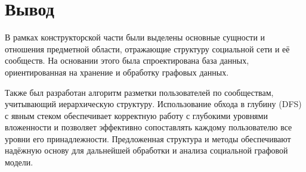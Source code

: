 \section*{Вывод}

В рамках конструкторской части были выделены основные сущности и отношения предметной области, отражающие структуру социальной сети и её сообществ. На основании этого была спроектирована база данных, ориентированная на хранение и обработку графовых данных.

Также был разработан алгоритм разметки пользователей по сообществам, учитывающий иерархическую структуру. Использование обхода в глубину (DFS) с явным стеком обеспечивает корректную работу с глубокими уровнями вложенности и позволяет эффективно сопоставлять каждому пользователю все уровни его принадлежности. Предложенная структура и методы обеспечивают надёжную основу для дальнейшей обработки и анализа социальной графовой модели.
